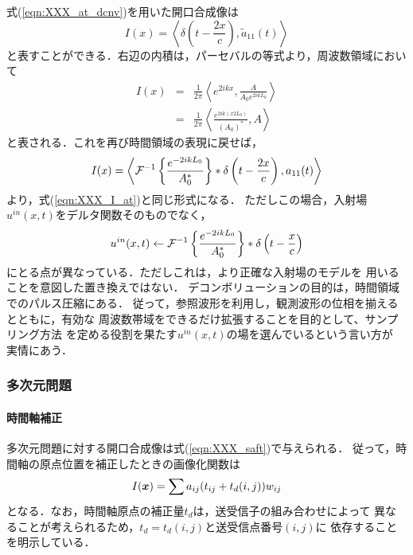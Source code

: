 式(\ref{eqn:XXX_at_dcnv})を用いた開口合成像は
\begin{equation}
	I(x)=\left< \delta\left(t-\frac{2x}{c}\right), \tilde a_{11}(t) \right>
	\label{eqn:XXX_25}
\end{equation}
と表すことができる．右辺の内積は，パーセバルの等式より，周波数領域において
\begin{eqnarray}
	I(x) &=&
	\frac{1}{2\pi}\left< e^{2ikx}, \frac{A}{A_0e^{2ikL_0}} \right> \\
	&=&
	\frac{1}{2\pi}\left< \frac{e^{2ik(x2L_0)}}{(A_0)^*}, A \right> 
	\label{eqn:XXX_26}
\end{eqnarray}
と表される．これを再び時間領域の表現に戻せば，
\begin{equation}
	I(x)= 
	\left< 
	{\cal F}^{-1}\left\{ \frac{e^{-2ikL_0}}{A_0^*}\right\} *\delta \left( t-\frac{2x}{c}\right), 
	a_{11}(t) \right>
	\label{eqn:XXX_Ix_dcnv}
\end{equation}
より，式(\ref{eqn:XXX_I_at})と同じ形式になる．
ただしこの場合，入射場$u^{in}(x,t)$をデルタ関数そのものでなく，
\begin{equation}
	u^{in}(x,t) \leftarrow
	{\cal F}^{-1}\left\{ \frac{e^{-2ikL_0}}{A_0^*}\right\} *\delta \left( t-\frac{x}{c}\right)
	\label{eqn:}
\end{equation}
にとる点が異なっている．ただしこれは，より正確な入射場のモデルを
用いることを意図した置き換えではない．
デコンボリューションの目的は，時間領域でのパルス圧縮にある．
従って，参照波形を利用し，観測波形の位相を揃えるとともに，有効な
周波数帯域をできるだけ拡張することを目的として、サンプリング方法
を定める役割を果たす$u^{in}(x,t)$の場を選んでいるという言い方が
実情にあう．
\subsubsection{多次元問題}
\paragraph{時間軸補正}
多次元問題に対する開口合成像は式(\ref{eqn:XXX_saft})で与えられる．
従って，時間軸の原点位置を補正したときの画像化関数は
\begin{equation}
	I(\mbox{\boldmath $x$})=\sum a_{ij}(t_{ij}+t_d(i,j))w_{ij}
	\label{eqn:XXX_27}
\end{equation}
となる．なお，時間軸原点の補正量$t_d$は，送受信子の組み合わせによって
異なることが考えられるため，$t_d=t_d(i,j)$と送受信点番号$(i,j)$に
依存することを明示している．
